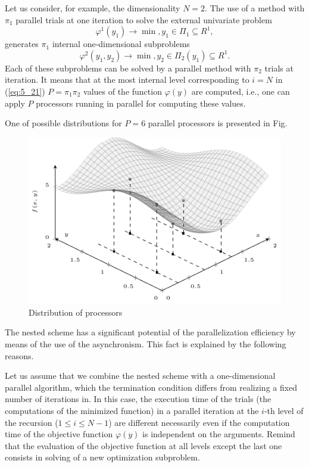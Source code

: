 Let us consider, for example, the dimensionality $N=2$. The use of a method with $\pi_1$  parallel trials at one iteration to solve the external univariate problem
\begin{displaymath}
\varphi^1(y_1)\rightarrow\min,y_1\in \Pi_1\subseteq R^1,
\end{displaymath}
generates  $\pi_1$ internal one-dimensional subproblems
\begin{displaymath}
\varphi^2(y_1,y_2)\rightarrow\min,y_2\in \Pi_2(y_1)\subseteq R^1.
\end{displaymath}
Each of these subproblems can be solved by a parallel method with  $\pi_2$  trials at iteration. It means that at the most internal level corresponding  to $i=N$  in (\ref{eq:5_21}) $P=\pi_1\pi_2$  values of the function $\varphi(y)$  are computed, i.e., one can apply $P$  processors running in parallel for computing these values. 

One of possible distributions for   $P=6$ parallel processors is presented in Fig. 
\begin{figure}[t]
\centering
\includegraphics[width=0.8\linewidth]{figures/figure_5_6.pdf}
\caption{Distribution of processors}
\label{fig:5_6}    
\end{figure}

The nested scheme has a significant potential of the parallelization efficiency by means of the use of the asynchronism. This fact is explained by the following reasons.

Let us assume that we combine the nested scheme with a one-dimensional parallel algorithm, which the termination condition differs from realizing a fixed number of iterations in. In this case, the execution time of the trials (the computations of the minimized function) in a parallel iteration at the $i$-th level of the recursion ($1\leq i\leq N-1$)  are different necessarily even if the computation time of the objective function $\varphi(y)$  is independent on the arguments. Remind that the evaluation of the objective function at all levels except the last one consists in solving of a new optimization subproblem.

